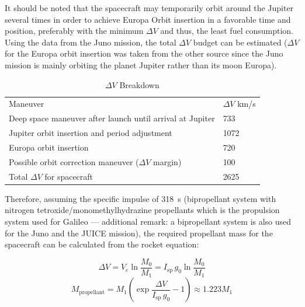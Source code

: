 It should be noted that the spacecraft may temporarily orbit around
the Jupiter several times in order to achieve Europa Orbit insertion
in a favorable time and position, preferably with the minimum
$\Delta V$ and thus, the least fuel consumption. Using the data from
the Juno mission, the total $\Delta V$ budget can be estimated
\cite{DMullerNet} ($\Delta V$ for the Europa orbit insertion was taken
from the other source since the Juno mission is mainly orbiting the
planet Jupiter rather than its moon
Europa). \cite{sweetser1997trajectory}

\begin{table}[H]
  \caption{$\Delta V$ Breakdown}
  \begin{tabular}{ll}
  Maneuver & $\Delta V$ \si{km/s} \\

  Deep space maneuver after launch until arrival at Jupiter & 733 \\

  Jupiter orbit insertion and period adjustment & 1072 \\

  Europa orbit insertion & 720 \\

  Possible orbit correction maneuver ($\Delta V$ margin) & 100 \\

  Total $\Delta V$ for spacecraft & 2625 \\
  \end{tabular}
\end{table}

Therefore, assuming the specific impulse of \SI{318}{s} (bipropellant
system with nitrogen tetroxide/monomethylhydrazine propellants which
is the propulsion system used for Galileo --- additional remark: a
bipropellant system is also used for the Juno and the JUICE
mission)\cite{Ampac}, the required propellant mass for the spacecraft
can be calculated from the rocket equation:

\begin{equation}
  \Delta V = V_e \ln \frac{M_0}{M_1}
  = I_{\mathrm{sp}} \, g_0 \ln \frac{M_0}{M_1}
\end{equation}
\begin{equation}
  M_{\mathrm{propellant}}
  = M_1 \left( \exp \frac{\Delta V}{I_{\mathrm{sp}} \, g_0} - 1 \right)
    \approx 1.223 M_1
\end{equation}
